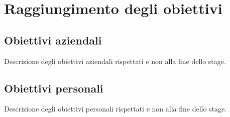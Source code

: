 \section{Raggiungimento degli obiettivi}
\label{sez:raggiungimento-obiettivi}

\subsection{Obiettivi aziendali}
\label{subsec:raggiungimento-obiettivi-aziendali}

Descrizione degli obiettivi aziendali rispettati e non alla fine dello stage.\\

\subsection{Obiettivi personali}
\label{subsec:raggiungimento-obiettivi-personali}

Descrizione degli obiettivi personali rispettati e non alla fine dello stage.\\
